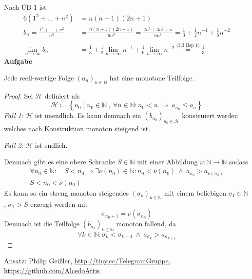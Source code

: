 \documentclass[a4paper, 12pt]{scrartcl}
\newcounter{taski}
\newcommand{\task}{\stepcounter{taski}\textbf{Aufgabe \arabic{taski}}\\}
\begin{document}
Nach ÜB 1 ist
\begin{align*}
	6(1^2 + \dots + n^2) &= n(n+1)(2n+1) \\
	b_n = \frac{1^2 + \dots + n^2}{n^3} &= \frac{n(n+1)(2n+1)}{6n^3} = \frac{2n^3 + 3n^2 + n}{6n^3} = \frac{1}{3} + \frac{1}{2}n^{-1} + \frac{1}{6}n^{-2} \\\\
	\lim_{n \rightarrow \infty} b_n &= \frac{1}{3} + \frac{1}{2}\lim_{n \rightarrow \infty} n^{-1} + \frac{1}{6} \lim_{n \rightarrow \infty} n^{-2} \stackrel{\text{(3.3 Bsp 1)}}{=} \frac{1}{3}
\end{align*}
\newpage
\task
\begin{theorem}
	Jede reell-wertige Folge $(a_n)_{n \in \mathbb{N}}$ hat eine monotone Teilfolge.
\end{theorem}
\begin{proof}
	Sei $\mathcal{H}$ definiert als
\[ \mathcal{H} \coloneqq \left\{ n_0 \mid n_0 \in \mathbb{N}\ ,\ \forall n \in \mathbb{N} : n_0 < n\ \Rightarrow\ a_{n_0} \leq a_n \right\} \]
\emph{Fall 1}: $\mathcal{H}$ ist unendlich. Es kann demnach ein $(b_{n_0})_{n_0 \in \mathcal{H}}$ konstruiert werden welches nach Konstruktion monoton steigend ist.

\emph{Fall 2}: $\mathcal{H}$ ist endlich.

Demnach gibt es eine obere Schranke $S \in \mathbb{N}$ mit einer Abbildung $\nu : \mathbb{N} \rightarrow \mathbb{N}$ sodass
\begin{gather*}
	\forall n_0 \in \mathbb{N} : \quad S < n_0 \Rightarrow \exists \nu(n_0) \in \mathbb{N} : n_0 < \nu(n_0)\ \wedge\ a_{n_0} > a_{\nu(n_0)} \\
	S < n_0 < \nu(n_0)
\end{gather*}
Es kann so ein streng monoton steigendes $(\sigma_k)_{k \in \mathbb{N}}$ mit einem beliebigen $\sigma_1 \in \mathbb{N}$ , $\sigma_1 > S$ erzeugt werden mit
\[ \sigma_{n_0+1} = \nu(\sigma_{n_0}) \]
Demnach ist die Teilfolge $(b_{\sigma_k})_{k \in \mathbb{N}}$ monoton fallend, da
\[ \forall k \in \mathbb{N} : \sigma_k < \sigma_{k+1} \ \wedge\ a_{\sigma_k} > a_{\sigma_{k+1}} \]
\end{proof}
Ansatz: Philip Geißler, \url{http://tiny.cc/TelegramGruppe}, \url{https://github.com/AlcedoAttis}
\end{document}
